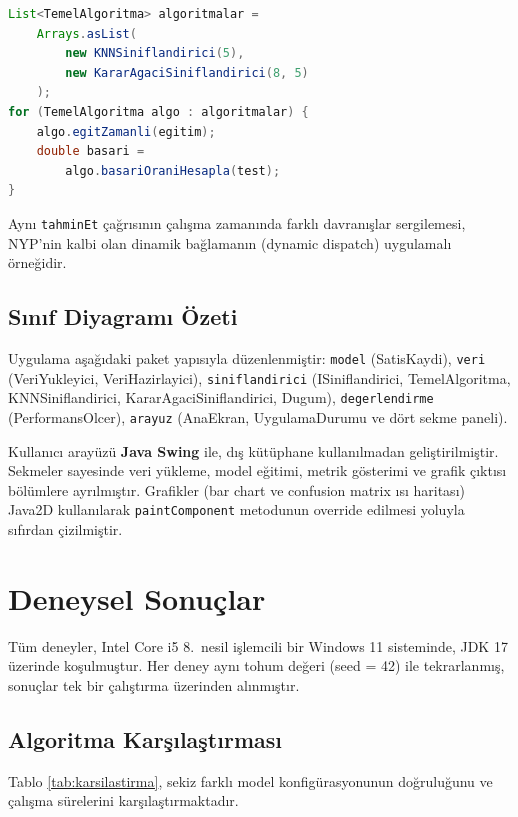 \documentclass[conference]{IEEEtran}
\begin{document}
\begin{lstlisting}[language=Java]
List<TemelAlgoritma> algoritmalar =
    Arrays.asList(
        new KNNSiniflandirici(5),
        new KararAgaciSiniflandirici(8, 5)
    );
for (TemelAlgoritma algo : algoritmalar) {
    algo.egitZamanli(egitim);
    double basari =
        algo.basariOraniHesapla(test);
}
\end{lstlisting}

Aynı \texttt{tahminEt} çağrısının çalışma zamanında farklı davranışlar sergilemesi, NYP'nin kalbi olan dinamik bağlamanın (dynamic dispatch) uygulamalı örneğidir.

\subsection{Sınıf Diyagramı Özeti}

Uygulama aşağıdaki paket yapısıyla düzenlenmiştir: \texttt{model} (SatisKaydi), \texttt{veri} (VeriYukleyici, VeriHazirlayici), \texttt{siniflandirici} (ISiniflandirici, TemelAlgoritma, KNNSiniflandirici, KararAgaciSiniflandirici, Dugum), \texttt{degerlendirme} (PerformansOlcer), \texttt{arayuz} (AnaEkran, UygulamaDurumu ve dört sekme paneli).

Kullanıcı arayüzü \textbf{Java Swing} ile, dış kütüphane kullanılmadan geliştirilmiştir. Sekmeler sayesinde veri yükleme, model eğitimi, metrik gösterimi ve grafik çıktısı bölümlere ayrılmıştır. Grafikler (bar chart ve confusion matrix ısı haritası) Java2D kullanılarak \texttt{paintComponent} metodunun override edilmesi yoluyla sıfırdan çizilmiştir.

\section{Deneysel Sonuçlar}

Tüm deneyler, Intel Core i5 8.\ nesil işlemcili bir Windows 11 sisteminde, JDK 17 üzerinde koşulmuştur. Her deney aynı tohum değeri (seed = 42) ile tekrarlanmış, sonuçlar tek bir çalıştırma üzerinden alınmıştır.

\subsection{Algoritma Karşılaştırması}

Tablo \ref{tab:karsilastirma}, sekiz farklı model konfigürasyonunun doğruluğunu ve çalışma sürelerini karşılaştırmaktadır.
\end{document}
